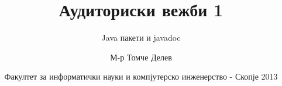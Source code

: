 

\author[АВ1]{М-р Томче Делев}
\title[Напредно програмирање]{Аудиториски вежби 1}
\subtitle{Java пакети и javadoc}
\date{Факултет за информатички науки и компјутерско инженерство - Скопје 2013}





\frame[t,plain]{\titlepage}









